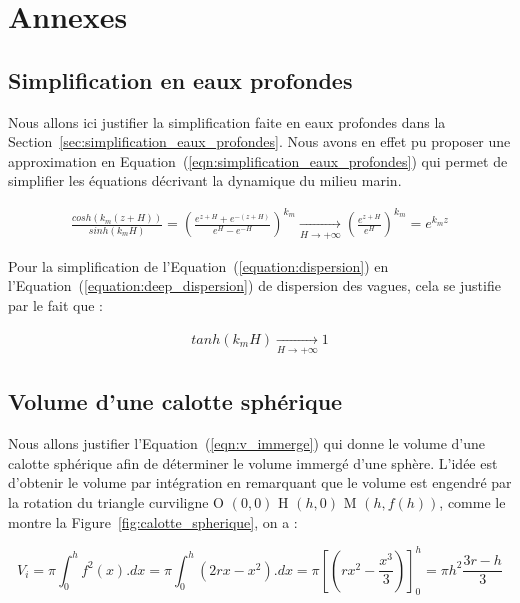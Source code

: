 \chapter{Annexes}
\label{annexe:gantt}

	\section{Simplification en eaux profondes}
	\label{annexe:deep_water}

		Nous allons ici justifier la simplification faite en eaux profondes dans la Section~\ref{sec:simplification_eaux_profondes}. Nous avons en effet pu proposer une approximation en Equation~(\ref{eqn:simplification_eaux_profondes}) qui permet de simplifier les équations décrivant la dynamique du milieu marin.

		\begin{eqnarray}
			\frac{cosh(k_m(z+H))}{sinh(k_mH)} = \left( \frac{e^{z+H} + e^{-(z+H)}}{e^{H}-e^{-H}} \right)^{k_m}  \xrightarrow[H \rightarrow + \infty]{}   \left( \frac{e^{z+H}}{e^{H}} \right)^{k_m} = e^{k_m z}
		\end{eqnarray}

		Pour la simplification de l'Equation~(\ref{equation:dispersion}) en l'Equation~(\ref{equation:deep_dispersion}) de dispersion des vagues, cela se justifie par le fait que :

		\begin{eqnarray}
			tanh(k_m H) \xrightarrow[H \rightarrow + \infty]{} 1
		\end{eqnarray}

	\section{Volume d'une calotte sphérique}
	\label{annexe:calotte_spherique}

		Nous allons justifier l'Equation~(\ref{eqn:v_immerge}) qui donne le volume d'une calotte sphérique afin de déterminer le volume immergé d'une sphère. L'idée est d'obtenir le volume par intégration en remarquant que le volume est engendré par la rotation du triangle curviligne O $(0, 0)$ H $(h, 0)$ M $(h, f(h))$, comme le montre la Figure~\ref{fig:calotte_spherique}, on a :

		\begin{equation}
			V_i = \pi \int_0^h f^2(x).dx = \pi \int_0^h (2rx - x^2).dx = \pi \left[(rx^2 - \frac{x^3}{3})\right]_0^h = \pi h^2 \frac{3r - h}{3}
		\end{equation}

